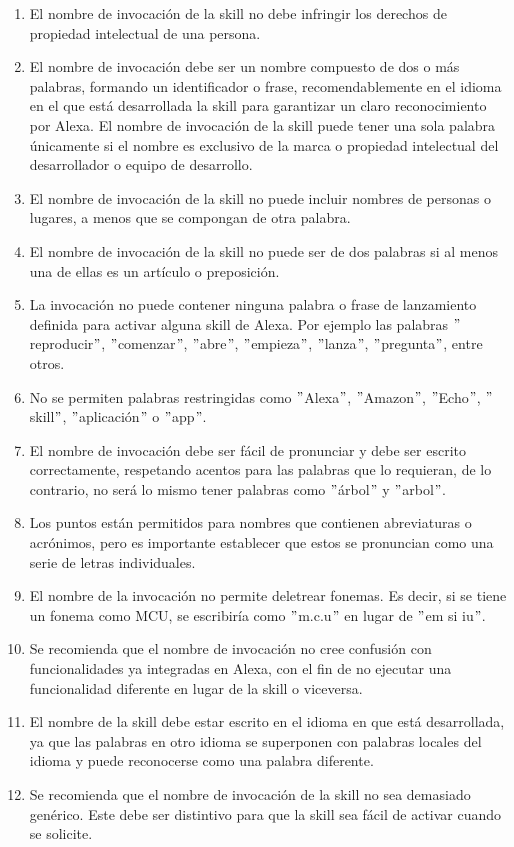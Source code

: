 \begin{enumerate}
  \item El nombre de invocación de la skill no debe infringir los derechos de propiedad intelectual de una persona.
  \item El nombre de invocación debe ser un nombre compuesto de dos o más palabras, formando un identificador o frase, recomendablemente en el idioma en el que está desarrollada la skill para garantizar un claro reconocimiento por Alexa. El nombre de invocación de la skill puede tener una sola palabra únicamente si el nombre es exclusivo de la marca o propiedad intelectual del desarrollador o equipo de desarrollo.
  \item El nombre de invocación de la skill no puede incluir nombres de personas o lugares, a menos que se compongan de otra palabra.
  \item El nombre de invocación de la skill no puede ser de dos palabras si al menos una de ellas es un artículo o preposición.
  \item La invocación no puede contener ninguna palabra o frase de lanzamiento definida para activar alguna skill de Alexa. Por ejemplo las palabras $"$reproducir$"$, $"$comenzar$"$, $"$abre$"$, $"$empieza$"$, $"$lanza$"$, $"$pregunta$"$, entre otros.
  \item No se permiten palabras restringidas como $"$Alexa$"$, $"$Amazon$"$, $"$Echo$"$, $"$skill$"$, $"$aplicación$"$ o $"$app$"$.
  \item El nombre de invocación debe ser fácil de pronunciar y debe ser escrito correctamente, respetando acentos para las palabras que lo requieran, de lo contrario, no será lo mismo tener palabras como $"$árbol$"$ y $"$arbol$"$.
  \item Los puntos están permitidos para nombres que contienen abreviaturas o acrónimos, pero es importante establecer que estos se pronuncian como una serie de letras individuales.
  \item El nombre de la invocación no permite deletrear fonemas. Es decir, si se tiene un fonema como MCU, se escribiría como $"$m.c.u$"$ en lugar de $"$em si iu$"$.
  \item Se recomienda que el nombre de invocación no cree confusión con funcionalidades ya integradas en Alexa, con el fin de no ejecutar una funcionalidad diferente en lugar de la skill o viceversa.
  \item El nombre de la skill debe estar escrito en el idioma en que está desarrollada, ya que las palabras en otro idioma se superponen con palabras locales del idioma y puede reconocerse como una palabra diferente.
  \item Se recomienda que el nombre de invocación de la skill no sea demasiado genérico. Este debe ser distintivo para que la skill sea fácil de activar cuando se solicite.
\end{enumerate}

